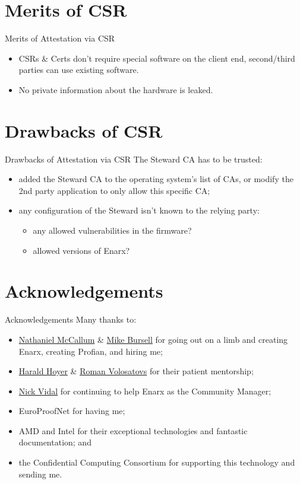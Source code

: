 \documentclass[graphics,compress]{beamer}
\begin{document}
\section{Merits of CSR}
\begin{frame}{Merits of Attestation via CSR}
\begin{itemize}
    \item CSRs \& Certs don't require special software on the client end, second/third parties can use existing software.
    \item No private information about the hardware is leaked.
\end{itemize}
\end{frame}

\section{Drawbacks of CSR}
\begin{frame}{Drawbacks of Attestation via CSR}
The Steward CA has to be trusted:
\begin{itemize}
    \item added the Steward CA to the operating system's list of CAs, or modify the 2nd party application to only allow this specific CA;
    \item any configuration of the Steward isn't known to the relying party:
    \begin{itemize}
        \item any allowed vulnerabilities in the firmware?
        \item allowed versions of Enarx?
    \end{itemize}
\end{itemize}
\end{frame}

\section{Acknowledgements}
\begin{frame}{Acknowledgements}
Many thanks to:
\begin{itemize}
    \item \href{https://github.com/npmccallum}{Nathaniel McCallum} \& \href{https://github.com/MikeCamel}{Mike Bursell} for going out on a limb and creating Enarx, creating Profian, and hiring me;
    \item \href{https://github.com/haraldh}{Harald Hoyer} \& \href{https://github.com/rvolosatovs}{Roman Volosatovs} for their patient mentorship;
    \item \href{https://github.com/nickvidal/}{Nick Vidal} for continuing to help Enarx as the Community Manager;
    \item EuroProofNet for having me;
    \item AMD and Intel for their exceptional technologies and fantastic documentation; and
    \item the Confidential Computing Consortium for supporting this technology and sending me.
\end{itemize}
\end{frame}
\end{document}
